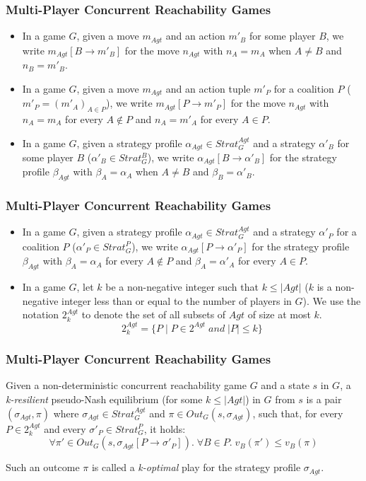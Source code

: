 \documentclass{beamer}
\begin{document}
\begin{frame}
\frametitle{Multi-Player Concurrent Reachability Games}
\begin{itemize}
\item In a game $G$, given a move $m_{Agt}$ and an action $m'_{B}$ for some player $B$, we write $m_{Agt}[B \rightarrow m'_{B}]$ for the move $n_{Agt}$ with $n_{A} = m_{A}$ when $A \neq B$ and $n_{B} = m'_{B}$.
\item In a game $G$, given a move $m_{Agt}$ and an action tuple $m'_{P}$ for a coalition $P$ ($m'_{P} = (m'_{A})_{A\in P}$), we write $m_{Agt}[P \rightarrow m'_{P}]$ for the move $n_{Agt}$ with $n_{A} = m_{A}$ for every $A \notin P$ and $n_{A} = m'_{A}$ for every $A \in P$.
\item In a game $G$, given a strategy profile $\alpha_{Agt} \in Strat^{Agt}_{G}$ and a strategy $\alpha'_{B}$ for some player $B$ ($\alpha'_{B} \in Strat^{B}_{G}$), we write $\alpha_{Agt}[B \rightarrow \alpha'_{B}]$ for the strategy profile $\beta_{Agt}$ with $\beta_{A} = \alpha_{A}$ when $A \neq B$ and $\beta_{B} = \alpha'_{B}$.
\end{itemize}
\end{frame}

\begin{frame}
\frametitle{Multi-Player Concurrent Reachability Games}
\begin{itemize}
\item In a game $G$, given a strategy profile $\alpha_{Agt} \in Strat^{Agt}_{G}$ and a strategy $\alpha'_{P}$ for a coalition $P$ ($\alpha'_{P} \in Strat^{P}_{G}$), we write $\alpha_{Agt}[P \rightarrow \alpha'_{P}]$ for the strategy profile $\beta_{Agt}$ with $\beta_{A} = \alpha_{A}$ for every $A \notin P$ and $\beta_{A} = \alpha'_{A}$ for every $A \in P$.
\item In a game $G$, let $k$ be a non-negative integer such that $k \leq \vert Agt \vert$ ($k$ is a non-negative integer less than or equal to the number of players in $G$). We use the notation $2^{Agt}_{k}$ to denote the set of all subsets of $Agt$ of size at most $k$.
\[2^{Agt}_{k} = \lbrace P \; \vert \; P \in 2^{Agt} \; and \; \vert P \vert \leq k \rbrace\] 
\end{itemize}
\end{frame}

\begin{frame}
\frametitle{Multi-Player Concurrent Reachability Games}
\begin{definition}
Given a non-deterministic concurrent reachability game $G$ and a state $s$ in $G$, a \textit{k-resilient} pseudo-Nash equilibrium (for some $k \leq \vert Agt \vert$) in $G$ from $s$ is a pair $(\sigma_{Agt}, \pi)$ where $\sigma_{Agt} \in Strat^{Agt}_{G}$ and $\pi \in Out_{G}(s, \sigma_{Agt})$, such that, for every $P \in 2^{Agt}_{k}$ and every $\sigma'_{P} \in Strat^{P}_{G}$, it holds:
\[\forall \pi' \in Out_{G}(s, \sigma_{Agt}[P \rightarrow \sigma'_{P}]). \; \forall B \in P. \; v_{B}(\pi') \leq v_{B}(\pi)\]

Such an outcome $\pi$ is called a \textit{k-optimal} play for the strategy profile $\sigma_{Agt}$.
\end{definition}
\end{frame}
\end{document}

